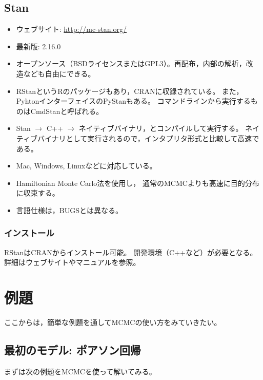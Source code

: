 \documentclass[11pt,uplatex]{jsarticle}
\begin{document}
\subsection{Stan}
\label{Stan}
\begin{itemize}

\item ウェブサイト:
  \url{http://mc-stan.org/}

\item 最新版: 2.16.0
\item オープンソース（BSDライセンスまたはGPL3）。再配布，内部の解析，改
  造なども自由にできる。
\item \textsf{RStan}という\textsf{R}のパッケージもあり，CRANに収録されている。
また，Pyhtonインターフェイスの\textsf{PyStan}もある。
コマンドラインから実行するものは\textsf{CmdStan}と呼ばれる。
\item Stan $\rightarrow$ C++ $\rightarrow$ ネイティブバイナリ，とコンパイルして実行する。
ネイティブバイナリとして実行されるので，インタプリタ形式と比較して高速である。
\item Mac, Windows, Linuxなどに対応している。
\item Hamiltonian Monte Carlo法\cite{PRML, BDA3, Toyoda2015}を使用し，
通常のMCMCよりも高速に目的分布に収束する。
\item 言語仕様は，BUGSとは異なる。
\end{itemize}

\subsubsection*{インストール}
RStanはCRANからインストール可能。
開発環境（C++など）が必要となる。
詳細はウェブサイトやマニュアルを参照。



\section{例題}

ここからは，簡単な例題を通してMCMCの使い方をみていきたい。

\subsection{最初のモデル: ポアソン回帰}

まずは次の例題をMCMCを使って解いてみる。

\vspace{1zw}
\end{document}
